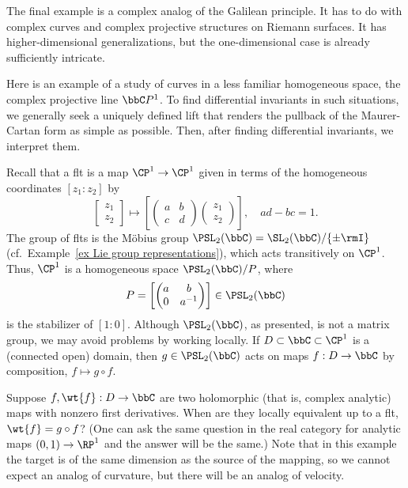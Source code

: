 The final example is a complex analog of the Galilean principle. It has to do with complex curves and complex projective structures on Riemann surfaces. It has higher-dimensional generalizations, but the one-dimensional case is already sufficiently intricate.

\begin{example}
    Here is an example of a study of curves in a less familiar homogeneous space, the complex projective line $\bbC  P^1$. To find differential invariants in such situations, we generally seek a uniquely defined lift that renders the pullback of the Maurer-Cartan form as simple as possible. Then, after finding differential invariants, we interpret them.

    Recall that a \gls{flt} is a map $\CP^1\to \CP^1$ given in terms of the homogeneous coordinates $[z_1:z_2]$ by 
    \[
        \begin{bmatrix}
            z_1\\z_2
        \end{bmatrix}
        \mapsto \left[\begin{pmatrix}
            a & b\\
            c& d
        \end{pmatrix}
        \begin{pmatrix}
            z_1\\z_2
        \end{pmatrix}\right],\quad ad-bc=1.
    \]
    The group of \glspl{flt} is the M\"obius group $\PSL_2(\bbC)=\SL_2(\bbC)\slash \{\pm \rmI\}$ (cf.\ Example~\ref{ex Lie group representations}), which acts transitively on $\CP^1$.  Thus, $\CP^1$ is a homogeneous space $\PSL_2(\bbC)\slash P$, where 
    \[P=\left[
        \begin{pmatrix}
            a & b \\
            0 & a^{-1}
        \end{pmatrix}
    \right]\in\PSL_2(\bbC)\]
    is the stabilizer of $[1:0]$. Although $\PSL_2(\bbC)$, as presented, is not a matrix group, we may avoid problems by working locally. If $D\subset \bbC\subset\CP^1$ is a (connected open) domain, then $g\in\PSL_2(\bbC)$ acts on maps $f:D\to \bbC$ by composition, $f\mapsto g\circ f$.

    Suppose $f,\wt{f}:D\to \bbC$ are two holomorphic (that is, complex analytic) maps with nonzero first derivatives. When are they locally equivalent up to a \gls{flt}, $\wt{f}=g\circ f$? (One can ask the same question in the real category for analytic maps $(0,1)\to \RP^1$ and the answer will be the same.) Note that in this example the target is of the same dimension as the source of the mapping, so we cannot expect an analog of curvature, but there will be an analog of velocity.


\end{example}
